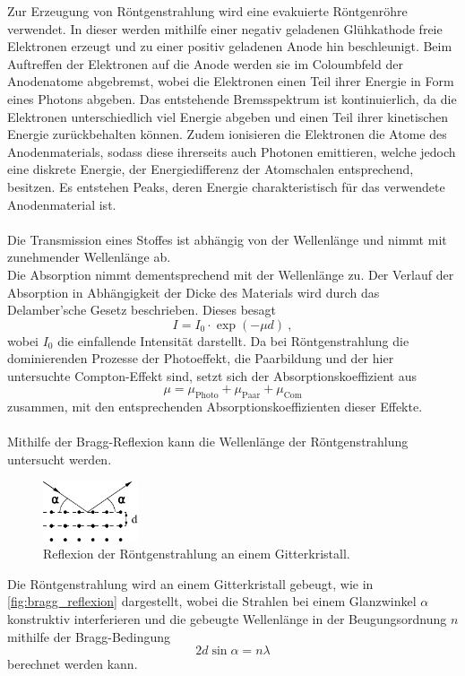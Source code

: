    Zur Erzeugung von Röntgenstrahlung wird eine evakuierte Röntgenröhre verwendet.
    In dieser werden mithilfe einer negativ geladenen Glühkathode freie Elektronen erzeugt
    und zu einer positiv geladenen Anode hin beschleunigt.
    Beim Auftreffen der Elektronen auf die Anode werden sie im Coloumbfeld der Anodenatome abgebremst,
    wobei die Elektronen einen Teil ihrer Energie in Form eines Photons abgeben.
    Das entstehende Bremsspektrum ist kontinuierlich,
    da die Elektronen unterschiedlich viel Energie abgeben
    und einen Teil ihrer kinetischen Energie zurückbehalten können.
    Zudem ionisieren die Elektronen die Atome des Anodenmaterials,
    sodass diese ihrerseits auch Photonen emittieren,
    welche jedoch eine diskrete Energie,
    der Energiedifferenz der Atomschalen entsprechend,
    besitzen.
    Es entstehen Peaks,
    deren Energie charakteristisch für das verwendete Anodenmaterial ist.\\
    \\
    Die Transmission eines Stoffes ist abhängig von der Wellenlänge und nimmt mit zunehmender Wellenlänge ab.\\
    Die Absorption nimmt dementsprechend mit der Wellenlänge zu.
    Der Verlauf der Absorption in Abhängigkeit der Dicke des Materials wird durch das Delamber'sche Gesetz beschrieben.
    Dieses besagt
    \begin{equation}
        I = I_0 \cdot \exp{(-\mu d)} \ ,
    \end{equation}
    wobei $I_0$ die einfallende Intensität darstellt.
    Da bei Röntgenstrahlung die dominierenden Prozesse der Photoeffekt,
    die Paarbildung und der hier untersuchte Compton-Effekt sind,
    setzt sich der Absorptionskoeffizient aus
    \begin{equation*}
        \mu = \mu_\text{Photo} + \mu_\text{Paar} + \mu_\text{Com}
    \end{equation*}
    zusammen,
    mit den entsprechenden Absorptionskoeffizienten dieser Effekte.\\
    \\
    Mithilfe der Bragg-Reflexion kann die Wellenlänge der Röntgenstrahlung untersucht werden.
    \begin{figure}[H]
       \centering
        \includegraphics[width=0.25\textwidth]{content/img/Abb_nonumber_bragg.pdf}
        \caption{Reflexion der Röntgenstrahlung an einem Gitterkristall. \cite{versuchsanleitung}}
       \label{fig:bragg_reflexion}
    \end{figure}
    Die Röntgenstrahlung wird an einem Gitterkristall gebeugt,
    wie in \autoref{fig:bragg_reflexion} dargestellt,
    wobei die Strahlen bei einem Glanzwinkel $\alpha$ konstruktiv interferieren
    und die gebeugte Wellenlänge in der Beugungsordnung $n$
    mithilfe der Bragg-Bedingung
    \begin{equation}
        2d \sin{\alpha} = n \lambda
        \label{eqn:bragg_bedingung}
    \end{equation}
    berechnet werden kann.


